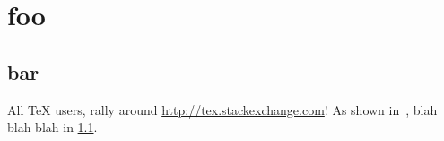 \documentclass{article}
\begin{document}
\tableofcontents
\section{foo}\label{foosec}
\subsection{bar}\label{barsubsec}
All \TeX{} users, rally around \url{http://tex.stackexchange.com}!
As shown in~\cite{bibexample}, blah blah blah in \cref{barsubsec}.

\end{document}
